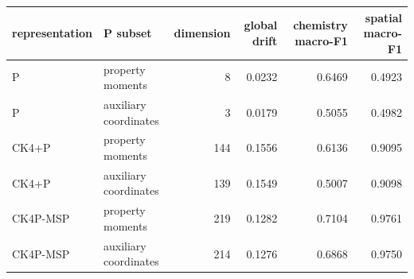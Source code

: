 \begin{tabular*}{\textwidth}{@{\extracolsep{\fill}}llrrrr@{}}
\toprule
\textbf{representation} & \textbf{P subset} & \textbf{dimension} & \textbf{global drift} & \textbf{chemistry macro-F1} & \textbf{spatial macro-F1} \\
\midrule
P & property moments & 8 & 0.0232 & 0.6469 & 0.4923 \\
P & auxiliary coordinates & 3 & 0.0179 & 0.5055 & 0.4982 \\
CK4+P & property moments & 144 & 0.1556 & 0.6136 & 0.9095 \\
CK4+P & auxiliary coordinates & 139 & 0.1549 & 0.5007 & 0.9098 \\
CK4P-MSP & property moments & 219 & 0.1282 & 0.7104 & 0.9761 \\
CK4P-MSP & auxiliary coordinates & 214 & 0.1276 & 0.6868 & 0.9750 \\
\bottomrule
\end{tabular*}
